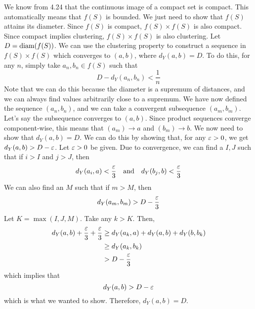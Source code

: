 \begin{pf}[source=Sultan]
    We know from 4.24 that the continuous image of a compact set is compact.
    This automatically means that $ f(S) $ is bounded.
    We just need to show that $ f(S) $ attains its diameter.
    Since $ f(S) $ is compact, $ f(S) \times f(S) $ is also compact.
    Since compact implies clustering, $ f(S) \times f(S) $ is also clustering.
    Let $ D = \textrm{diam}(f(S)) $. We can use the clustering property to
    construct a sequence in $ f(S) \times f(S) $ which converges to $ (a, b) $,
    where $ d_{Y}(a, b) = D $.
    To do this, for any $ n $, simply take $ a_{n}, b_{n} \in f(S) $ such that
    \begin{equation*}
        D - d_{Y}(a_{n},b_{n}) < \frac{1}{n}
    \end{equation*}
    Note that we can do this because the diameter is a supremum of distances,
    and we can always find values arbitrarily close to a supremum.
    We have now defined the sequence $ (a_{n}, b_{n}) $, and we can take a
    convergent subsequence $ (a_{m}, b_{m}) $.
    Let's say the subsequence converges to $ (a, b) $.
    Since product sequences converge component-wise, this means that
    $ (a_{m}) \rightarrow a $ and $ (b_{m}) \rightarrow b $. \vsp
    We now need to show that $ d_{Y}(a, b) = D $.
    We can do this by showing that, for any $ \operatorname{\varepsilon} > 0 $, we get
    $ d_{Y}(a, b) > D - \operatorname{\varepsilon} $. Let $ \operatorname{\varepsilon} > 0 $ be given.
    Due to convergence, we can find a $ I, J $ such that if $ i > I $ and
    $ j > J $, then
    \begin{equation*}
        d_{Y}(a_{i}, a) < \frac{\operatorname{\varepsilon}}{3} \quad \textrm{and} \quad
        d_{Y}(b_{j}, b) < \frac{\operatorname{\varepsilon}}{3}
    \end{equation*}
    We can also find an $ M $ such that if $ m > M $, then
    \begin{equation*}
        d_{Y}(a_{m}, b_{m}) > D - \frac{\operatorname{\varepsilon}}{3}
    \end{equation*}
    Let $ K = \max(I,J,M) $. Take any $ k > K $. Then,
    \begin{align*}
        d_{Y}(a,b)+\frac{\operatorname{\varepsilon}}{3}+\frac{\operatorname{\varepsilon}}{3}&\geq d_{Y}(a_{k}, a)+d_{Y}(a,b)
        +d_{Y}(b,b_{k})\\
        &\geq d_{Y}(a_{k},b_{k}) \\
        &> D-\frac{\operatorname{\varepsilon}}{3}
    \end{align*}
    which implies that
    \begin{equation*}
        d_{Y}(a,b)>D-\operatorname{\varepsilon}
    \end{equation*}
    which is what we wanted to show. Therefore, $ d_{Y}(a,b)=D $.
\end{pf}

